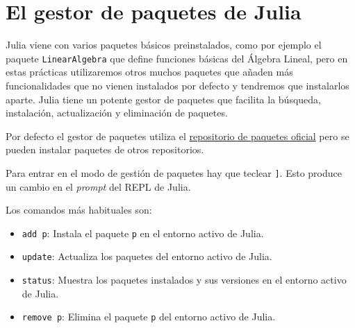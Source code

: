 \documentclass[
  a4paper,
]{scrreport}
\providecommand{\tightlist}{%
  \setlength{\itemsep}{0pt}\setlength{\parskip}{0pt}}\usepackage{longtable,booktabs,array}
\theoremstyle{definition}
\theoremstyle{remark}
\begin{document}
\hypertarget{el-gestor-de-paquetes-de-julia}{%
\section{El gestor de paquetes de
Julia}\label{el-gestor-de-paquetes-de-julia}}

Julia viene con varios paquetes básicos preinstalados, como por ejemplo
el paquete \texttt{LinearAlgebra} que define funciones básicas del
Álgebra Lineal, pero en estas prácticas utilizaremos otros muchos
paquetes que añaden más funcionalidades que no vienen instalados por
defecto y tendremos que instalarlos aparte. Julia tiene un potente
gestor de paquetes que facilita la búsqueda, instalación, actualización
y eliminación de paquetes.

Por defecto el gestor de paquetes utiliza el
\href{https://julialang.org/packages/}{repositorio de paquetes oficial}
pero se pueden instalar paquetes de otros repositorios.

Para entrar en el modo de gestión de paquetes hay que teclear
\texttt{{]}}. Esto produce un cambio en el \emph{prompt} del REPL de
Julia.

Los comandos más habituales son:

\begin{itemize}
\tightlist
\item
  \texttt{add\ p}: Instala el paquete \texttt{p} en el entorno activo de
  Julia.
\item
  \texttt{update}: Actualiza los paquetes del entorno activo de Julia.
\item
  \texttt{status}: Muestra los paquetes instalados y sus versiones en el
  entorno activo de Julia.
\item
  \texttt{remove\ p}: Elimina el paquete \texttt{p} del entorno activo
  de Julia.
\end{itemize}
\end{document}
